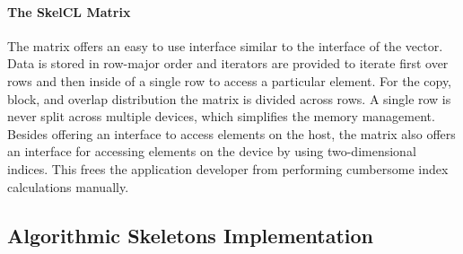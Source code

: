 
\paragraph{The SkelCL Matrix}
The \SkelCL matrix offers an easy to use interface similar to the interface of the vector.
Data is stored in row-major order and iterators are provided to iterate first over rows and then inside of a single row to access a particular element.
For the copy, block, and overlap distribution the matrix is divided across rows.
A single row is never split across multiple devices, which simplifies the memory management.
Besides offering an interface to access elements on the host, the matrix also offers an interface for accessing elements on the device by using two-dimensional indices.
This frees the application developer from performing cumbersome index calculations manually.

\subsection{Algorithmic Skeletons Implementation}
\label{section:skelcl-library:skeletons}





